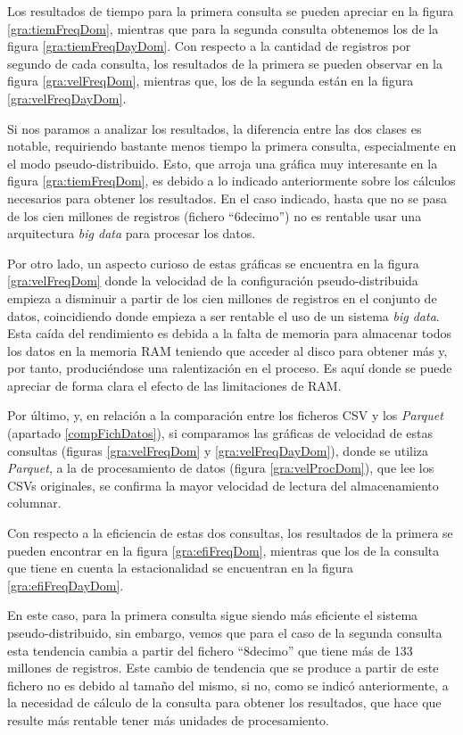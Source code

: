 Los resultados de tiempo para la primera consulta se pueden apreciar en la figura \ref{gra:tiemFreqDom}, mientras que para la segunda consulta obtenemos los de la figura \ref{gra:tiemFreqDayDom}. Con respecto a la cantidad de registros por segundo de cada consulta, los resultados de la primera se pueden observar en la figura \ref{gra:velFreqDom}, mientras que, los de la segunda están en la figura \ref{gra:velFreqDayDom}.

Si nos paramos a analizar los resultados, la diferencia entre las dos clases es notable, requiriendo bastante menos tiempo la primera consulta, especialmente en el modo pseudo-distribuido. Esto, que arroja una gráfica muy interesante en la figura \ref{gra:tiemFreqDom}, es debido a lo indicado anteriormente sobre los cálculos necesarios para obtener los resultados. En el caso indicado, hasta que no se pasa de los cien millones de registros (fichero ``6decimo'') no es rentable usar una arquitectura \textit{big data} para procesar los datos.

Por otro lado, un aspecto curioso de estas gráficas se encuentra en la figura \ref{gra:velFreqDom} donde la velocidad de la configuración pseudo-distribuida empieza a disminuir a partir de los cien millones de registros en el conjunto de datos, coincidiendo donde empieza a ser rentable el uso de un sistema \textit{big data}. Esta caída del rendimiento es debida a la falta de memoria para almacenar todos los datos en la memoria \gls{RAM} teniendo que acceder al disco para obtener más y, por tanto, produciéndose una ralentización en el proceso. Es aquí donde se puede apreciar de forma clara el efecto de las limitaciones de \gls{RAM}.

Por último, y, en relación a la comparación entre los ficheros \gls{CSV} y los \textit{Parquet} (apartado \ref{compFichDatos}), si comparamos las gráficas de velocidad de estas consultas (figuras \ref{gra:velFreqDom} y \ref{gra:velFreqDayDom}), donde se utiliza \textit{Parquet}, a la de procesamiento de datos (figura \ref{gra:velProcDom}), que lee los \gls{CSV}s originales, se confirma la mayor velocidad de lectura del almacenamiento columnar.

Con respecto a la eficiencia de estas dos consultas, los resultados de la primera se pueden encontrar en la figura \ref{gra:efiFreqDom}, mientras que los de la consulta que tiene en cuenta la estacionalidad se encuentran en la figura \ref{gra:efiFreqDayDom}.

En este caso, para la primera consulta sigue siendo más eficiente el sistema pseudo-distribuido, sin embargo, vemos que para el caso de la segunda consulta esta tendencia cambia a partir del fichero ``8decimo'' que tiene más de 133 millones de registros. Este cambio de tendencia que se produce a partir de este fichero no es debido al tamaño del mismo, si no, como se indicó anteriormente, a la necesidad de cálculo de la consulta para obtener los resultados, que hace que resulte más rentable tener más unidades de procesamiento.

